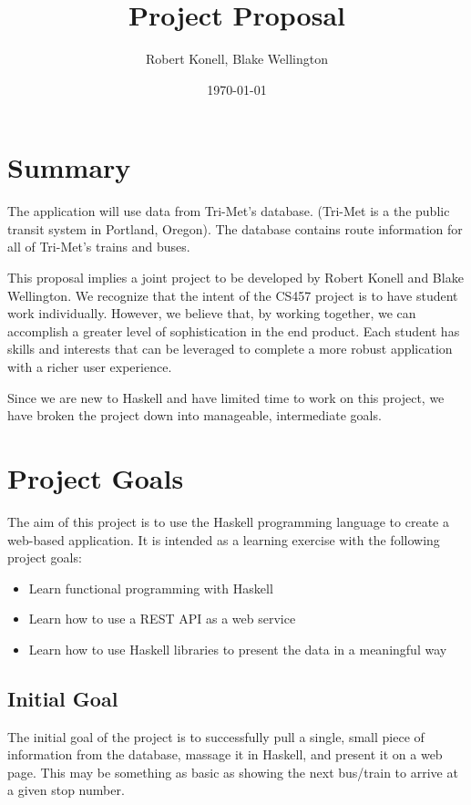\documentclass{article}
\title{Project Proposal}
\author{Robert Konell, Blake Wellington}
\date{\today}
\begin{document}
\maketitle
\thispagestyle{fancy}
\pagestyle{fancy}

\section*{Summary}
The application will use data from Tri-Met's database. (Tri-Met is a 
the public transit system in Portland, Oregon). The database contains
route information for all of Tri-Met's trains and buses.

This proposal implies a joint project to be developed by Robert Konell and
Blake Wellington. We recognize that the intent of the CS457 project is to
have student work individually. However, we believe that, by working together,
we can accomplish a greater level of sophistication in the end product.
Each student has skills and interests that can be leveraged to complete
a more robust application with a richer user experience.

Since we are new to Haskell and have limited time to work on this project,
we have broken the project down into manageable, intermediate goals.

\section*{Project Goals}
The aim of this project is to use the Haskell programming language to 
create a web-based application. It is intended as a learning exercise
with the following project goals:

\begin{itemize}
\item Learn functional programming with Haskell
\item Learn how to use a REST API as a web service
\item Learn how to use Haskell libraries to present the data in a meaningful way
\end{itemize}
  
\subsection*{Initial Goal}
The initial goal of the project is to successfully pull a single, small
piece of information from the database, massage it in Haskell, and present
it on a web page. This may be something as basic as showing the next bus/train
to arrive at a given stop number.
\end{document}
